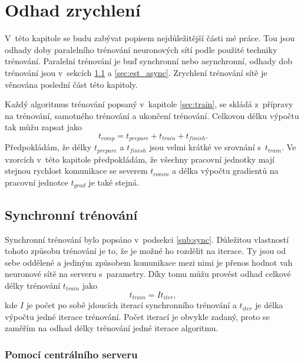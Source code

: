 
\chapter{Odhad zrychlení}
\label{chap:est}

V~této kapitole se budu zabývat popisem nejdůležitější části mé práce.
Tou jsou odhady doby paralelního trénování neuronových sítí podle použité techniky trénování. 
Paralelní trénování je buď synchronní nebo asynchronní, odhady dob trénování jsou v~sekcích \ref{sec:est_sync} a \ref{sec:est_async}.
Zrychlení trénování sítě je věnována poslední část této kapitoly.

Každý algoritmus trénování popsaný v~kapitole \ref{sec:train}, se skládá z~přípravy na trénování, samotného trénování a ukončení trénování.
Celkovou délku výpočtu tak můžu zapsat jako \begin{equation}t_{comp}=t_{prepare}+t_{train}+t_{finish}.\label{eq:est_comp}\end{equation}
Předpokládám, že délky $t_{prepare}$ a $t_{finish}$ jsou velmi krátké ve srovnání s~$t_{train}$.
Ve vzorcích v~této kapitole předpokládám, že všechny pracovní jednotky mají stejnou rychlost komunikace se severem $t_{comm}$ a délka výpočtu gradientů na pracovní jednotce $t_{grad}$ je také stejná.

\section{Synchronní trénování}
\label{sec:est_sync}

Synchronní trénování bylo popsáno v~podsekci \ref{sub:sync}.
Důležitou vlastností tohoto způsobu trénování je to, že je možné ho rozdělit na iterace.
Ty jsou od sebe oddělené a jediným způsobem komunikace mezi nimi je přenos hodnot vah neuronové sítě na serveru s~parametry.
Díky tomu můžu provést odhad celkové délky trénování $t_{train}$ jako \begin{equation}t_{train}=It_{iter},\label{eq:est_sync_train}\end{equation} kde $I$ je počet po sobě jdoucích iterací synchronního trénování a $t_{iter}$ je délka výpočtu jedné iterace trénování.
Počet iterací je obvykle zadaný, proto se zaměřím na odhad délky trénování jedné iterace algoritmu.

\subsection{Pomocí centrálního serveru}
\label{sub:est_sync_cent}

